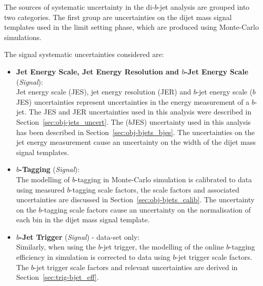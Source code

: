 The sources of systematic uncertainty in the di-$b$-jet analysis are grouped into two categories.
The first group are uncertainties on the dijet mass signal templates used in the limit setting phase, which are produced using Monte-Carlo simulations.

\noindent
The signal systematic uncertainties considered are:
\begin{itemize}[leftmargin=*]
\item\textbf{Jet Energy Scale, Jet Energy Resolution  and $b$-Jet Energy Scale} \hspace{1mm} (\textit{Signal}):\\
  Jet energy scale (JES), jet energy resolution (JER) and  $b$-jet energy scale ($b$JES) uncertainties
  represent uncertainties in the energy measurement of a $b$-jet.
  The JES and JER uncertainties used in this analysis were described in Section~\ref{sec:obj-jets_uncert}.
  The ($b$JES) uncertainty used in this analysis has been described in Section~\ref{sec:obj-bjets_bjes}.
  The uncertainties on the jet energy measurement cause an uncertainty on the width of the dijet mass signal templates.\vspace{0.5em}
\item\textbf{$b$-Tagging} \hspace{1mm} (\textit{Signal}):\\
  The modelling of $b$-tagging in Monte-Carlo simulation is calibrated to data using measured $b$-tagging scale factors,
  the scale factors and associated uncertainties are discussed in Section~\ref{sec:obj-bjets_calib}.
  The uncertainty on the $b$-tagging scale factors cause an uncertainty on the normalisation of each bin in the dijet mass signal template.
  \vspace{0.5em}
\item\textbf{$b$-Jet Trigger} \hspace{1mm} (\textit{Signal}) - \lm{} data-set only:\\
  Similarly, when using the $b$-jet trigger,
  the modelling of the online $b$-tagging efficiency in simulation is corrected to data using $b$-jet trigger scale factors.
  The $b$-jet trigger scale factors and relevant uncertainties are derived in Section~\ref{sec:trig-bjet_eff}.

\end{itemize}
